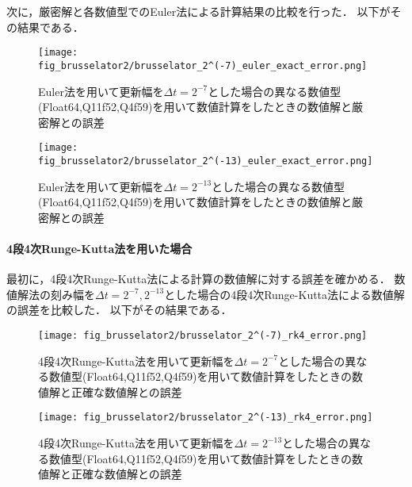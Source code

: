 次に，厳密解と各数値型でのEuler法による計算結果の比較を行った．
以下がその結果である．\\
\begin{figure}[H]
    \centering
    \begin{minipage}[b]{0.49\columnwidth}
        \centering
        \texttt{[image: fig\_brusselator2/brusselator\_2^(-7)\_euler\_exact\_error.png]}
        \caption{Euler法を用いて更新幅を$\Delta t = 2^{-7}$とした場合の異なる数値型(Float64,Q11f52,Q4f59)を用いて数値計算をしたときの数値解と厳密解との誤差}
        \label{fig:brusselator_2^(-7)_euler_exact_error}
    \end{minipage}
    \begin{minipage}[b]{0.49\columnwidth}
        \centering
        \texttt{[image: fig\_brusselator2/brusselator\_2^(-13)\_euler\_exact\_error.png]}
        \caption{Euler法を用いて更新幅を$\Delta t =  2^{-13}$とした場合の異なる数値型(Float64,Q11f52,Q4f59)を用いて数値計算をしたときの数値解と厳密解との誤差}
        \label{fig:brusselator_2^(-13)_euler_exact_error}
    \end{minipage}
\end{figure}



\paragraph*{4段4次Runge-Kutta法を用いた場合}
最初に，4段4次Runge-Kutta法による計算の数値解に対する誤差を確かめる．
数値解法の刻み幅を$\Delta t = 2^{-7},2^{-13}$とした場合の4段4次Runge-Kutta法による数値解の誤差を比較した．
以下がその結果である．
\begin{figure}[H]
    \centering
    \begin{minipage}[b]{0.49\columnwidth}
        \centering
        \texttt{[image: fig\_brusselator2/brusselator\_2^(-7)\_rk4\_error.png]}
        \caption{4段4次Runge-Kutta法を用いて更新幅を$\Delta t = 2^{-7}$とした場合の異なる数値型(Float64,Q11f52,Q4f59)を用いて数値計算をしたときの数値解と正確な数値解との誤差}
        \label{fig:brusselator_2^(-7)_rk4_error}
    \end{minipage}
    \begin{minipage}[b]{0.49\columnwidth}
        \centering
        \texttt{[image: fig\_brusselator2/brusselator\_2^(-13)\_rk4\_error.png]}
        \caption{4段4次Runge-Kutta法を用いて更新幅を$\Delta t =  2^{-13}$とした場合の異なる数値型(Float64,Q11f52,Q4f59)を用いて数値計算をしたときの数値解と正確な数値解との誤差}
        \label{fig:brusselator_2^(-13)_rk4_error}
    \end{minipage}
\end{figure}

